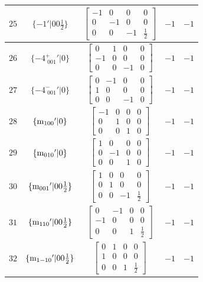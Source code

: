 \documentclass[fleqn,8pt]{jsarticle}
\begin{document}
\begin{longtable}{ccccc}
$ 25 $ & $ \{-1{}'|0 0 \frac{1}{2}\} $ & $ \begin{bmatrix} -1 & 0 & 0 & 0 \\ 0 & -1 & 0 & 0 \\ 0 & 0 & -1 & \frac{1}{2} \end{bmatrix} $ & $ -1 $ & $ -1 $ \\ \hline
$ 26 $ & $ \{-4^{+}_{\,\,001}{}'|0\} $ & $ \begin{bmatrix} 0 & 1 & 0 & 0 \\ -1 & 0 & 0 & 0 \\ 0 & 0 & -1 & 0 \end{bmatrix} $ & $ -1 $ & $ -1 $ \\ \hline
$ 27 $ & $ \{-4^{-}_{\,\,001}{}'|0\} $ & $ \begin{bmatrix} 0 & -1 & 0 & 0 \\ 1 & 0 & 0 & 0 \\ 0 & 0 & -1 & 0 \end{bmatrix} $ & $ -1 $ & $ -1 $ \\ \hline
$ 28 $ & $ \{{\rm m}_{100}{}'|0\} $ & $ \begin{bmatrix} -1 & 0 & 0 & 0 \\ 0 & 1 & 0 & 0 \\ 0 & 0 & 1 & 0 \end{bmatrix} $ & $ -1 $ & $ -1 $ \\ \hline
$ 29 $ & $ \{{\rm m}_{010}{}'|0\} $ & $ \begin{bmatrix} 1 & 0 & 0 & 0 \\ 0 & -1 & 0 & 0 \\ 0 & 0 & 1 & 0 \end{bmatrix} $ & $ -1 $ & $ -1 $ \\ \hline
$ 30 $ & $ \{{\rm m}_{001}{}'|0 0 \frac{1}{2}\} $ & $ \begin{bmatrix} 1 & 0 & 0 & 0 \\ 0 & 1 & 0 & 0 \\ 0 & 0 & -1 & \frac{1}{2} \end{bmatrix} $ & $ -1 $ & $ -1 $ \\ \hline
$ 31 $ & $ \{{\rm m}_{110}{}'|0 0 \frac{1}{2}\} $ & $ \begin{bmatrix} 0 & -1 & 0 & 0 \\ -1 & 0 & 0 & 0 \\ 0 & 0 & 1 & \frac{1}{2} \end{bmatrix} $ & $ -1 $ & $ -1 $ \\ \hline
$ 32 $ & $ \{{\rm m}_{1-10}{}'|0 0 \frac{1}{2}\} $ & $ \begin{bmatrix} 0 & 1 & 0 & 0 \\ 1 & 0 & 0 & 0 \\ 0 & 0 & 1 & \frac{1}{2} \end{bmatrix} $ & $ -1 $ & $ -1 $ \\
\end{longtable}
\end{document}
